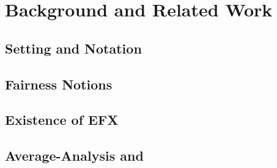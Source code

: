 \chapter{Background and Related Work}\label{ch:background}

\section{Setting and Notation}
\section{Fairness Notions}
\section{Existence of EFX}
\section{Average-Analysis and }

